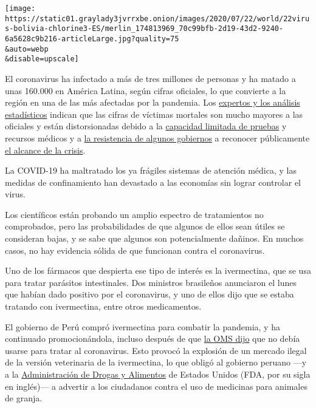 \texttt{[image: https://static01.graylady3jvrrxbe.onion/images/2020/07/22/world/22virus-bolivia-chlorine3-ES/merlin\_174813969\_70c99bfb-2d19-43d2-9240-6a5628c9b216-articleLarge.jpg?quality=75\\\&auto=webp\\\&disable=upscale]}

El coronavirus ha infectado a más de tres millones de personas y ha
matado a unas 160.000 en América Latina, según cifras oficiales, lo que
convierte a la región en una de las más afectadas por la pandemia. Los
\href{https://www.nytimes3xbfgragh.onion/interactive/2020/04/21/world/coronavirus-missing-deaths.html}{expertos
y los análisis estadísticos} indican que las cifras de víctimas mortales
son mucho mayores a las oficiales y están distorsionadas debido a la
\href{https://www.nytimes3xbfgragh.onion/es/2020/04/23/espanol/america-latina/virus-ecuador-muertes.html}{capacidad
limitada de pruebas} y recursos médicos y a
\href{https://www.nytimes3xbfgragh.onion/es/2020/05/08/espanol/america-latina/mexico-coronavirus.html}{la
resistencia de algunos gobiernos} a reconocer públicamente
\href{https://www.nytimes3xbfgragh.onion/es/2020/06/08/espanol/america-latina/brasil-cifras-coronavirus.html}{el
alcance de la crisis}.

La COVID-19 ha maltratado los ya frágiles sistemas de atención médica, y
las medidas de confinamiento han devastado a las economías sin lograr
controlar el virus.

Los científicos están probando un amplio espectro de tratamientos no
comprobados, pero las probabilidades de que algunos de ellos sean útiles
se consideran bajas, y se sabe que algunos son potencialmente dañinos.
En muchos casos, no hay evidencia sólida de que funcionan contra el
coronavirus.

Uno de los fármacos que despierta ese tipo de interés es la ivermectina,
que se usa para tratar parásitos intestinales. Dos ministros brasileños
anunciaron el lunes que habían dado positivo por el coronavirus, y uno
de ellos dijo que se estaba tratando con ivermectina, entre otros
medicamentos.

El gobierno de Perú compró ivermectina para combatir la pandemia, y ha
continuado promocionándola, incluso después de que
\href{https://www.paho.org/es/documentos/recomendacion-sobre-uso-ivermectina-tratamiento-covid-19}{la
OMS dijo} que no debía usarse para tratar al coronavirus. Esto provocó
la explosión de un mercado ilegal de la versión veterinaria de la
ivermectina, lo que obligó al gobierno peruano ---y a la
\href{https://www.fda.gov/animal-veterinary/product-safety-information/fda-letter-stakeholders-do-not-use-ivermectin-intended-animals-treatment-covid-19-humans}{Administración
de Drogas y Alimentos} de Estados Unidos (FDA, por su sigla en
inglés)--- a advertir a los ciudadanos contra el uso de medicinas para
animales de granja.

